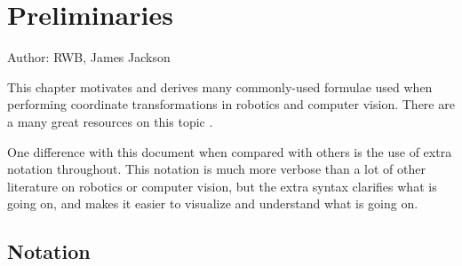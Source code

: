\chapter{Preliminaries}
\label{chap:preliminaries}

Author: RWB, James Jackson

This chapter motivates and derives many commonly-used formulae used
when performing coordinate transformations in robotics and computer
vision. There are a many great resources on this topic
\cite[-2in]{Barfoot2019}\cite[-1in]{Drummond2014}\cite[1in]{Ethan2019}\cite[2in]{Sola2019}.

%


One difference with this document when compared with others is the
use of extra notation throughout. This notation is much more verbose
than a lot of other literature on robotics or computer vision, but
the extra syntax clarifies what is going on, and makes it easier 
to visualize
and understand what is going on. 


\section{Notation}

